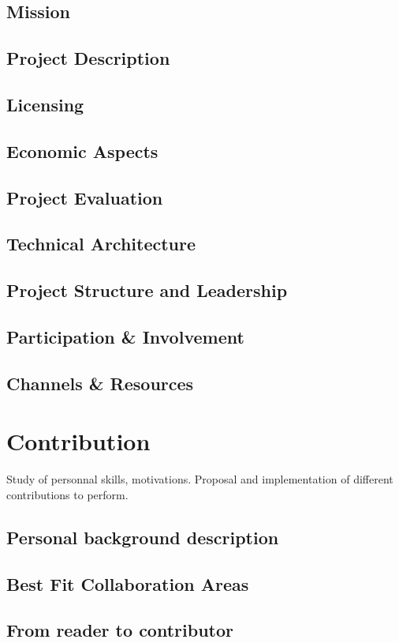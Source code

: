 \documentclass[11pt]{article}
\begin{document}
\subsection{Mission}
\subsection{Project Description}
\subsection{Licensing}
\subsection{Economic Aspects}
\subsection{Project Evaluation}
\subsection{Technical Architecture}
\subsection{Project Structure and Leadership}
\subsection{Participation \& Involvement}
\subsection{Channels \& Resources}
\section{Contribution}
Study of personnal skills, motivations. Proposal and implementation of different contributions to perform.
\subsection{Personal background description}
\subsection{Best Fit Collaboration Areas}
\subsection{From reader to contributor}
\end{document}
